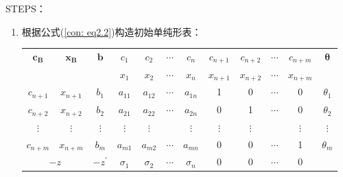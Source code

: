 \documentclass{book}
\begin{document}
STEPS：
\begin{enumerate}
    \item 根据公式(\ref{con: eq2.2})构造初始单纯形表：\\

          \begin{table}[ht]
              \centering
              \begin{tabular}{c|c|c|cccccccc|c}
                  \hline
                  \multirow{2}{*}{$\boldsymbol{c_B}$} & \multirow{2}{*}{$\boldsymbol{x_B}$} & \multirow{2}{*}{$\boldsymbol{b}$} & $c_1$      & $c_2$    & $\cdots$   & $c_n$    & $c_{n+1}$ & $c_{n+2}$ & $\cdots$ & $c_{n+m}$ & \multirow{2}{*}{$\boldsymbol{\theta}$} \\
                  \cline{4-11}
                                                      &                                     &                                   & $x_1$      & $x_2$    & $\cdots$   & $x_n$    & $x_{n+1}$ & $x_{n+2}$ & $\cdots$ & $x_{n+m}$ &                                        \\
                  \hline
                  $c_{n+1}$                           & $x_{n+1}$                           & $b_1$                             & $a_{11}$   & $a_{12}$ & $\cdots$   & $a_{1n}$ & 1         & 0         & $\cdots$ & 0         & $\theta_1$                             \\
                  $c_{n+2}$                           & $x_{n+2}$                           & $b_2$                             & $a_{21}$   & $a_{22}$ & $\cdots$   & $a_{2n}$ & 0         & 1         & $\cdots$ & 0         & $\theta_2$                             \\
                  $\vdots$                            & $\vdots$                            & $\vdots$                          & $\vdots$   & $\vdots$ &            & $\vdots$ & $\vdots$  & $\vdots$  &          & $\vdots$  & $\vdots$                               \\
                  $c_{n+m}$                           & $x_{n+m}$                           & $b_m$                             & $a_{m1}$   & $a_{m2}$ & $\cdots$   & $a_{mn}$ & 0         & 0         & $\cdots$ & 1         & $\theta_m$                             \\
                  \hline
                  \multicolumn{2}{c|}{$-z$}           & $-z^{\prime}$                       & $\sigma_1$                        & $\sigma_2$ & $\cdots$ & $\sigma_n$ & 0        & 0         & $\cdots$  & 0        &                                                    \\

\end{tabular}
\end{table}
\end{enumerate}
\end{document}
